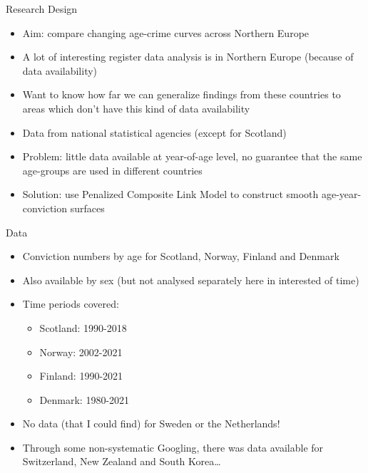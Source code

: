 \documentclass[
  ignorenonframetext,
]{beamer}
\begin{document}
\begin{frame}{Research Design}
\protect\hypertarget{research-design}{}
\begin{itemize}
\item
  Aim: compare changing age-crime curves across Northern Europe
\item
  A lot of interesting register data analysis is in Northern Europe
  (because of data availability)
\item
  Want to know how far we can generalize findings from these countries
  to areas which don't have this kind of data availability
\item
  Data from national statistical agencies (except for Scotland)
\item
  Problem: little data available at year-of-age level, no guarantee that
  the same age-groups are used in different countries
\item
  Solution: use Penalized Composite Link Model to construct smooth
  age-year-conviction surfaces
\end{itemize}
\end{frame}

\begin{frame}{Data}
\protect\hypertarget{data}{}
\begin{itemize}
\item
  Conviction numbers by age for Scotland, Norway, Finland and Denmark
\item
  Also available by sex (but not analysed separately here in interested
  of time)
\item
  Time periods covered:

  \begin{itemize}
  \item
    Scotland: 1990-2018
  \item
    Norway: 2002-2021
  \item
    Finland: 1990-2021
  \item
    Denmark: 1980-2021
  \end{itemize}
\item
  No data (that I could find) for Sweden or the Netherlands!
\item
  Through some non-systematic Googling, there was data available for
  Switzerland, New Zealand and South Korea\ldots{}
\end{itemize}
\end{frame}
\end{document}
